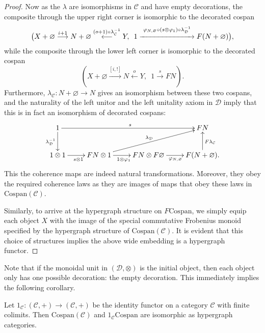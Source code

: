 \begin{proof}
Now as the $\lambda$ are isomorphisms in $\mathcal C$ and have empty
decorations, the composite through the upper right corner is isomorphic to the
decorated cospan
\[
  \big(X+\varnothing \stackrel{i+1}\longrightarrow N+\varnothing
  \stackrel{(o+1)\circ \lambda^{-1}_{\mathcal C}}\longleftarrow Y,\enspace 1
  \stackrel{\varphi_{N,\varnothing} \circ (s \otimes \varphi_1) \circ
  \lambda^{-1}_{\mathcal D}}{\xrightarrow{\hspace*{2.5cm}}} F(N+\varnothing)\big),
\]
while the composite through the lower left corner is isomorphic to the decorated
cospan
\[
  (X+\varnothing \stackrel{[i,!]}\longrightarrow N
\stackrel{o}\longleftarrow Y,\enspace 1 \stackrel{s}\longrightarrow FN).
\]
Furthermore, $\lambda_{\mathcal C}\colon  N+\varnothing \rightarrow N$ gives an isomorphism
between these two cospans, and the naturality of the left unitor and the left
unitality axiom in $\mathcal D$ imply that this is in fact an isomorphism of
decorated cospans:
\[
  \xymatrix{
    1 \ar[rrr]^{s} \ar[d]_{\lambda^{-1}_{\mathcal D}} &&& FN \\
    1 \otimes 1 \ar[r]_{s \otimes 1} & FN \otimes 1 \ar[r]_{1 \otimes \varphi_1}
    \ar[urr]^{\lambda_{\mathcal D}} & FN \otimes F\varnothing
    \ar[r]_{\varphi_{N,\varnothing}} & F(N+\varnothing).
    \ar[u]_{F\lambda_{\mathcal C}}
  }
\]
This the coherence maps are indeed natural transformations. Moreover, they obey
the required coherence laws as they are images of maps that obey these laws in
$\mathrm{Cospan(\mathcal{C})}$. 

  Similarly, to arrive at the hypergraph structure on $F\mathrm{Cospan}$, we
  simply equip each object $X$ with the image of the special commutative
  Frobenius monoid specified by the hypergraph structure of
  $\mathrm{Cospan(\mathcal{C})}$. It is evident that this choice of structures
  implies the above wide embedding is a hypergraph functor.
\end{proof}

Note that if the monoidal unit in $(\mathcal D,\otimes)$ is the initial object,
then each object only has one possible decoration: the empty decoration. This
immediately implies the following corollary.
\begin{corollary}
  Let $1_{\mathcal C}\colon (\mathcal C,+) \to (\mathcal C,+)$ be the identity functor
  on a category $\mathcal C$ with finite colimits. Then
  $\mathrm{Cospan}(\mathcal C)$ and $1_{\mathcal C}\mathrm{Cospan}$ are
  isomorphic as hypergraph categories.
\end{corollary}

